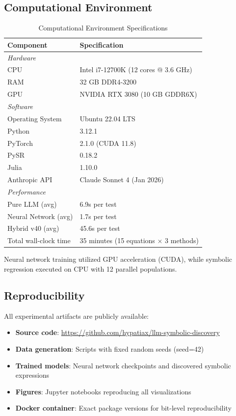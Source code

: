 \documentclass[twoside,11pt]{article}
\begin{document}
\subsection{Computational Environment}

\begin{table}[htbp]
\centering
\caption{Computational Environment Specifications}
\label{tab:environment}
\begin{tabular}{ll}
\toprule
\textbf{Component} & \textbf{Specification} \\
\midrule
\multicolumn{2}{l}{\textit{Hardware}} \\
CPU & Intel i7-12700K (12 cores @ 3.6 GHz) \\
RAM & 32 GB DDR4-3200 \\
GPU & NVIDIA RTX 3080 (10 GB GDDR6X) \\
\midrule
\multicolumn{2}{l}{\textit{Software}} \\
Operating System & Ubuntu 22.04 LTS \\
Python & 3.12.1 \\
PyTorch & 2.1.0 (CUDA 11.8) \\
PySR & 0.18.2 \\
Julia & 1.10.0 \\
Anthropic API & Claude Sonnet 4 (Jan 2026) \\
\midrule
\multicolumn{2}{l}{\textit{Performance}} \\
Pure LLM (avg) & 6.9s per test \\
Neural Network (avg) & 1.7s per test \\
Hybrid v40 (avg) & 45.6s per test \\
Total wall-clock time & 35 minutes (15 equations $\times$ 3 methods) \\
\bottomrule
\end{tabular}
\end{table}

Neural network training utilized GPU acceleration (CUDA), while symbolic regression executed on CPU with 12 parallel populations.

\subsection{Reproducibility}

All experimental artifacts are publicly available:

\begin{itemize}
    \item \textbf{Source code}: \url{https://github.com/hypatiax/llm-symbolic-discovery}
    \item \textbf{Data generation}: Scripts with fixed random seeds (seed=42)
    \item \textbf{Trained models}: Neural network checkpoints and discovered symbolic expressions
    \item \textbf{Figures}: Jupyter notebooks reproducing all visualizations
    \item \textbf{Docker container}: Exact package versions for bit-level reproducibility
\end{itemize}
\end{document}
